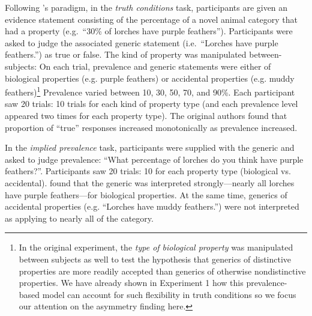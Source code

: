 \documentclass[10pt,letterpaper]{article}
\begin{document}
Following \citeauthor{Cimpian2010}'s paradigm, in the \emph{truth conditions} task, participants are given an evidence statement consisting of the percentage of a novel animal category that had a property (e.g.~``30\% of lorches have purple feathers''). Participants were asked to judge the associated generic statement (i.e.~``Lorches have purple feathers.'') as true or false. The kind of property was manipulated between-subjects: On each trial, prevalence and generic statements were either of biological properties (e.g. purple feathers) or accidental properties (e.g. muddy feathers)\footnote{In the original experiment, the \emph{type of biological property} was manipulated between subjects as well to test the hypothesis that generics of distinctive properties are more readily accepted than generics of otherwise nondistinctive properties.  We have already shown in Experiment 1 how this prevalence-based model can account for such flexibility in truth conditions so we focus our attention on the asymmetry finding here.} Prevalence varied between 10, 30, 50, 70, and 90\%. Each participant saw 20 trials: 10 trials for each kind of property type (and each prevalence level appeared two times for each property type). The original authors found that proportion of ``true'' responses increased monotonically as prevalence increased. 

In the \emph{implied prevalence} task, participants were supplied with the generic and asked to judge prevalence: ``What percentage of lorches do you think have purple feathers?''. Participants saw 20 trials: 10 for each property type (biological vs. accidental).  \citeauthor{Cimpian2010} found that the generic was interpreted strongly---nearly all lorches have purple feathers---for biological properties. At the same time, generics of accidental properties (e.g. ``Lorches have muddy feathers.'') were not interpreted as applying to nearly all of the category.


%
 
\end{document}
